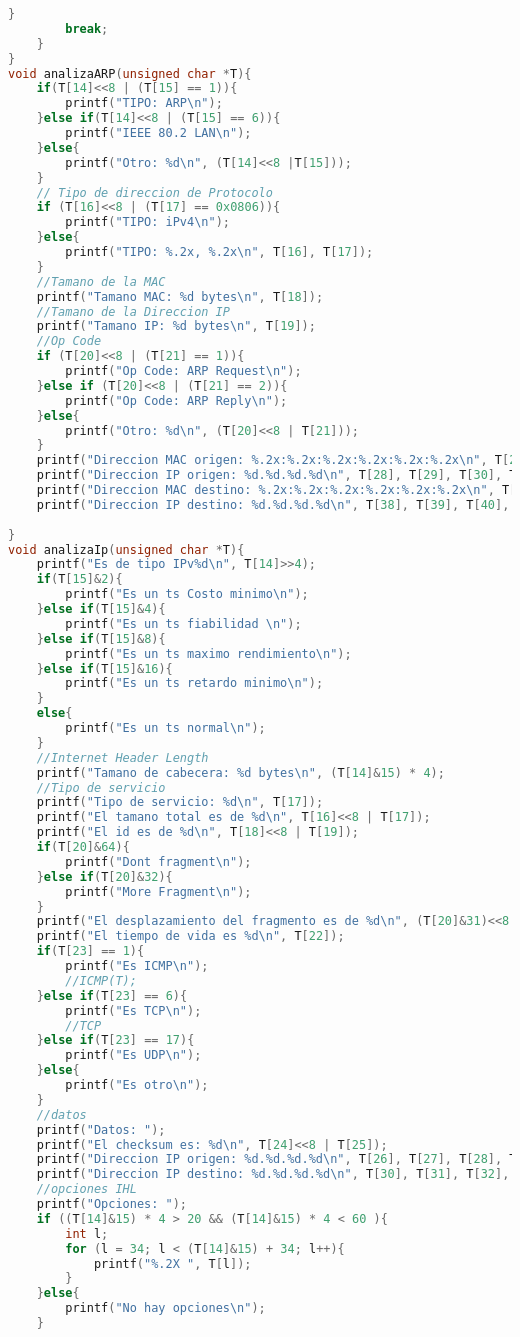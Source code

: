 \begin{lstlisting}[language={C}, caption={Analizador de tramas en C}, label={Script}]
        }
        break;
    }
}
void analizaARP(unsigned char *T){
    if(T[14]<<8 | (T[15] == 1)){
        printf("TIPO: ARP\n");
    }else if(T[14]<<8 | (T[15] == 6)){
        printf("IEEE 80.2 LAN\n");
    }else{
        printf("Otro: %d\n", (T[14]<<8 |T[15]));
    }
    // Tipo de direccion de Protocolo
    if (T[16]<<8 | (T[17] == 0x0806)){
        printf("TIPO: iPv4\n");
    }else{
        printf("TIPO: %.2x, %.2x\n", T[16], T[17]);
    }
    //Tamano de la MAC
    printf("Tamano MAC: %d bytes\n", T[18]);
    //Tamano de la Direccion IP
    printf("Tamano IP: %d bytes\n", T[19]);
    //Op Code
    if (T[20]<<8 | (T[21] == 1)){
        printf("Op Code: ARP Request\n");
    }else if (T[20]<<8 | (T[21] == 2)){
        printf("Op Code: ARP Reply\n");
    }else{
        printf("Otro: %d\n", (T[20]<<8 | T[21]));
    }
    printf("Direccion MAC origen: %.2x:%.2x:%.2x:%.2x:%.2x:%.2x\n", T[22], T[23], T[24], T[25], T[26], T[27]);
    printf("Direccion IP origen: %d.%d.%d.%d\n", T[28], T[29], T[30], T[31]);
    printf("Direccion MAC destino: %.2x:%.2x:%.2x:%.2x:%.2x:%.2x\n", T[32], T[33], T[34], T[35], T[36], T[37]);
    printf("Direccion IP destino: %d.%d.%d.%d\n", T[38], T[39], T[40], T[41]);
    
}
void analizaIp(unsigned char *T){
	printf("Es de tipo IPv%d\n", T[14]>>4);
	if(T[15]&2){
		printf("Es un ts Costo minimo\n");
	}else if(T[15]&4){
		printf("Es un ts fiabilidad \n");
	}else if(T[15]&8){
		printf("Es un ts maximo rendimiento\n");
	}else if(T[15]&16){
		printf("Es un ts retardo minimo\n");
	}
    else{
        printf("Es un ts normal\n");
    }
    //Internet Header Length
    printf("Tamano de cabecera: %d bytes\n", (T[14]&15) * 4);
    //Tipo de servicio
    printf("Tipo de servicio: %d\n", T[17]);
	printf("El tamano total es de %d\n", T[16]<<8 | T[17]);
	printf("El id es de %d\n", T[18]<<8 | T[19]);
	if(T[20]&64){
		printf("Dont fragment\n");
	}else if(T[20]&32){
		printf("More Fragment\n");
	}
	printf("El desplazamiento del fragmento es de %d\n", (T[20]&31)<<8 | T[21]);
	printf("El tiempo de vida es %d\n", T[22]);
	if(T[23] == 1){
		printf("Es ICMP\n");
        //ICMP(T);
	}else if(T[23] == 6){
        printf("Es TCP\n");
        //TCP
    }else if(T[23] == 17){
        printf("Es UDP\n");
    }else{
        printf("Es otro\n");
    }
    //datos
    printf("Datos: ");    
    printf("El checksum es: %d\n", T[24]<<8 | T[25]);
	printf("Direccion IP origen: %d.%d.%d.%d\n", T[26], T[27], T[28], T[29]);
	printf("Direccion IP destino: %d.%d.%d.%d\n", T[30], T[31], T[32], T[33]);
    //opciones IHL
    printf("Opciones: ");
    if ((T[14]&15) * 4 > 20 && (T[14]&15) * 4 < 60 ){
        int l;
        for (l = 34; l < (T[14]&15) + 34; l++){
            printf("%.2X ", T[l]);
        }
    }else{
        printf("No hay opciones\n");
    }
    

\end{lstlisting}
